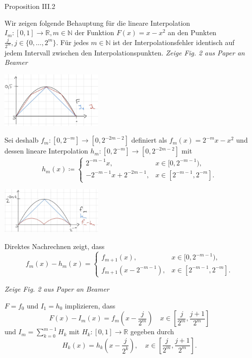 \documentclass[12pt]{article}
\newcommand{\N}{\mathbb{N}} %
\newcommand{\R}{\mathbb{R}} %
\renewcommand{\set}[1]{\{#1\}}
\begin{document}
{\Large Proposition III.2}

Wir zeigen folgende Behauptung für die lineare Interpolation 
\(I_m : [0,1] \rightarrow \R, m\in \N\) der Funktion 
\(F(x) = x - x^2\) an den Punkten \(\frac{j}{2^m}, j \in \set{0,\ldots, 2^m}\).
Für jedes \(m\in\N\) ist der Interpolationsfehler identisch auf jedem Intervall zwischen 
den Interpolationspunkten. \textit{Zeige Fig. 2 aus Paper an Beamer}

\begin{center}
    \includegraphics[width=5cm]{images/iii2_1.jpg} %
\end{center}

Sei deshalb \(f_m: [0,2^{-m}] \rightarrow [0,2^{-2m-2}]\) definiert als \(f_m(x) = 2^{-m}x - x^2\)
und dessen lineare Interpolation \(h_m: [0,2^{-m}] \rightarrow [0,2^{-2m-2}]\) mit 
\[ h_m(x) \coloneqq \begin{cases}
    2^{-m-1}x, &x\in [0,2^{-m-1}), \\
    -2^{-m-1}x + 2^{-2m-1}, &x \in [2^{-m-1}, 2^{-m}].
\end{cases} \]

\begin{center}
    \includegraphics[width=5cm]{images/iii2_2.jpg} %
\end{center}

Direktes Nachrechnen zeigt, dass 
\[ f_m(x) - h_m(x) = \begin{cases}
    f_{m+1}(x), &x\in [0, 2^{-m-1}), \\
    f_{m+1}(x - 2^{-m-1}), &x \in [2^{-m-1}, 2^{-m}].
\end{cases} \]

\textit{Zeige Fig. 2 aus Paper an Beamer}

\(F = f_0\) und \(I_1 = h_0\) implizieren, dass 
\[ F(x) - I_m(x) = f_m(x - \frac{j}{2^m}) \quad x\in [\frac{j}{2^m}, \frac{j+1}{2^m}] \]
und \(I_m = \sum_{k=0}^{m-1} H_k\) mit \(H_k : [0,1]\rightarrow \R\) gegeben durch 
\[ H_k(x) = h_k(x - \frac{j}{2^k}), \quad x\in [\frac{j}{2^m}, \frac{j+1}{2^m}]. \]
\end{document}

